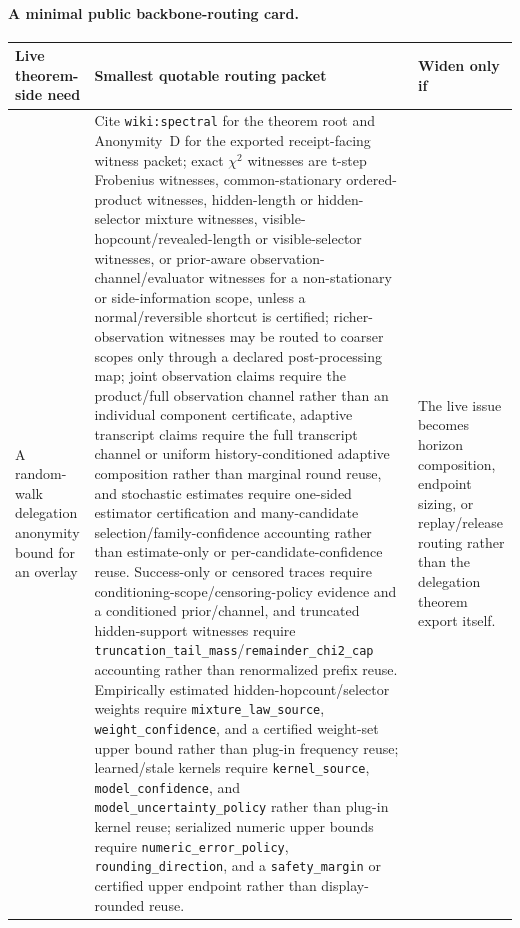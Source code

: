 \documentclass[11pt]{article}
\begin{document}
\paragraph{A minimal public backbone-routing card.}
\begin{table}[t]
\centering
\small
\begin{tabularx}{\linewidth}{@{}L Y Y@{}}
\toprule
Live theorem-side need & Smallest quotable routing packet & Widen only if \\
\midrule
A random-walk delegation anonymity bound for an overlay & Cite \texttt{wiki:spectral} for the theorem root and Anonymity~D for the exported receipt-facing witness packet; exact $\chi^2$ witnesses are t-step Frobenius witnesses, common-stationary ordered-product witnesses, hidden-length or hidden-selector mixture witnesses, visible-hopcount/revealed-length or visible-selector witnesses, or prior-aware observation-channel/evaluator witnesses for a non-stationary or side-information scope, unless a normal/reversible shortcut is certified; richer-observation witnesses may be routed to coarser scopes only through a declared post-processing map; joint observation claims require the product/full observation channel rather than an individual component certificate, adaptive transcript claims require the full transcript channel or uniform history-conditioned adaptive composition rather than marginal round reuse, and stochastic estimates require one-sided estimator certification and many-candidate selection/family-confidence accounting rather than estimate-only or per-candidate-confidence reuse. Success-only or censored traces require conditioning-scope/censoring-policy evidence and a conditioned prior/channel, and truncated hidden-support witnesses require \nolinkurl{truncation_tail_mass}/\nolinkurl{remainder_chi2_cap} accounting rather than renormalized prefix reuse. Empirically estimated hidden-hopcount/selector weights require \nolinkurl{mixture_law_source}, \nolinkurl{weight_confidence}, and a certified weight-set upper bound rather than plug-in frequency reuse; learned/stale kernels require \nolinkurl{kernel_source}, \nolinkurl{model_confidence}, and \nolinkurl{model_uncertainty_policy} rather than plug-in kernel reuse; serialized numeric upper bounds require \nolinkurl{numeric_error_policy}, \nolinkurl{rounding_direction}, and a \nolinkurl{safety_margin} or certified upper endpoint rather than display-rounded reuse. & The live issue becomes horizon composition, endpoint sizing, or replay/release routing rather than the delegation theorem export itself. \\

\end{tabularx}
\end{table}
\end{document}
